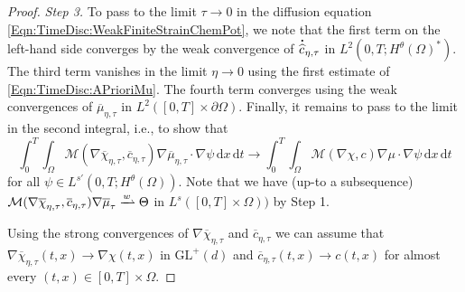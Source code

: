 \documentclass[a4paper,12pt]{article}
\newcommand{\calM}{\mathcal{M}}
\newcommand{\pl}{\partial}
\newcommand{\dx}{\mathrm{\,d}x}
\newcommand{\dt}{\mathrm{\,d}t}
\newcommand{\chibar}{\overline{\chi}}
\newcommand{\mubar}{\overline{\mu}}
\newcommand{\cbar}{\overline{c}}
\newcommand{\chat}{\widehat{c}}
\newcommand\DT[1]{\mathchoice
                 {{\buildrel{\hspace*{.1em}\text{\LARGE.}}\over{#1}}}
                 {{\buildrel{\hspace*{.1em}\text{\Large.}}\over{#1}}}
                 {{\buildrel{\hspace*{.1em}\text{\large.}}\over{#1}}}
                 {{\buildrel{\hspace*{.1em}\text{\large.}}\over{#1}}}}
\renewcommand{\dot}{\DT}
\newcommand{\GL}{\mathrm{GL}}
\newcommand{\wto}{\xrightharpoonup{w}}
\theoremstyle{plain}
\theoremstyle{definition}
\numberwithin{equation}{section}
\begin{document}
\begin{proof}
\emph{Step 3.}
To pass to the limit $\tau\to 0$ in the diffusion equation
\eqref{Eqn:TimeDisc:WeakFiniteStrainChemPot}, we note that the 
first term on the left-hand side converges 
by the weak convergence of $\dot\chat_{\eta,\tau}$ in $L^2(0,T;H^\theta(\Omega)^*)$. The third term vanishes in the limit $\eta\to 0$ using the first estimate of \eqref{Eqn:TimeDisc:APrioriMu}. The fourth term converges using the weak convergences of $\mubar_{\eta,\tau}$ in $L^2([0,T]\times\pl\Omega)$. Finally, it remains to pass to the limit in the second integral, i.e., to show that
\[
\int_0^T\int_\Omega \calM(\nabla\chibar_{\eta,\tau},\cbar_{\eta,\tau})\nabla\mubar_{\eta,\tau} \cdot \nabla\psi\dx \dt \to \int_0^T\int_\Omega \calM(\nabla\chi,
c)\nabla\mu \cdot \nabla\psi\dx\dt
\]
for all $\psi\in L^{s'}(0,T;H^\theta(\Omega))$. Note that we have (up-to a subsequence) $\calM(\nabla\chibar_{\eta,\tau}, \cbar_{\eta,\tau})\nabla\mubar_\tau \wto \Theta$ in $L^s([0,T]\times\Omega))$ by Step 1.


Using the strong convergences of $\nabla\chibar_{\eta,\tau}$ and $\cbar_{\eta,\tau}$ we can assume that
$\nabla \chibar_{\eta,\tau}(t,x) \to \nabla\chi(t,x)$ in $\GL^+(d)$ and $\cbar_{\eta,\tau}(t,x) \to c(t,x)$ for almost every $(t,x)\in[0,T]\times\Omega$. 



\end{proof}
\end{document}

